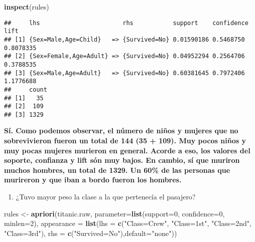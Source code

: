 \documentclass[]{article}
\newenvironment{Shaded}{\begin{snugshade}}{\end{snugshade}}
\newcommand{\DataTypeTok}[1]{\textcolor[rgb]{0.13,0.29,0.53}{#1}}
\newcommand{\DecValTok}[1]{\textcolor[rgb]{0.00,0.00,0.81}{#1}}
\newcommand{\KeywordTok}[1]{\textcolor[rgb]{0.13,0.29,0.53}{\textbf{#1}}}
\newcommand{\NormalTok}[1]{#1}
\newcommand{\StringTok}[1]{\textcolor[rgb]{0.31,0.60,0.02}{#1}}
\providecommand{\tightlist}{%
  \setlength{\itemsep}{0pt}\setlength{\parskip}{0pt}}
\begin{document}
\begin{Shaded}
\begin{Highlighting}[]
\KeywordTok{inspect}\NormalTok{(rules)}
\end{Highlighting}
\end{Shaded}

\begin{verbatim}
##     lhs                       rhs           support    confidence lift     
## [1] {Sex=Male,Age=Child}   => {Survived=No} 0.01590186 0.5468750  0.8078335
## [2] {Sex=Female,Age=Adult} => {Survived=No} 0.04952294 0.2564706  0.3788535
## [3] {Sex=Male,Age=Adult}   => {Survived=No} 0.60381645 0.7972406  1.1776688
##     count
## [1]   35 
## [2]  109 
## [3] 1329
\end{verbatim}

\textbf{Sí. Como podemos observar, el número de niños y mujeres que no
sobrevivieron fueron un total de 144 (35 + 109). Muy pocos niños y muy
pocas mujeres murieron en general. Acorde a eso, los valores del
soporte, confianza y lift són muy bajos. En cambio, sí que muriron
muchos hombres, un total de 1329. Un 60\% de las personas que murireron
y que iban a bordo fueron los hombres.}

\begin{enumerate}
\def\labelenumi{\alph{enumi})}
\setcounter{enumi}{1}
\tightlist
\item
  ¿Tuvo mayor peso la clase a la que pertenecía el pasajero?
\end{enumerate}

\begin{Shaded}
\begin{Highlighting}[]
\NormalTok{rules <-}\StringTok{ }\KeywordTok{apriori}\NormalTok{(titanic.raw, }\DataTypeTok{parameter=}\KeywordTok{list}\NormalTok{(}\DataTypeTok{support=}\DecValTok{0}\NormalTok{, }\DataTypeTok{confidence=}\DecValTok{0}\NormalTok{, }\DataTypeTok{minlen=}\DecValTok{2}\NormalTok{), }
                 \DataTypeTok{appearance =} \KeywordTok{list}\NormalTok{(}\DataTypeTok{lhs =} \KeywordTok{c}\NormalTok{(}\StringTok{"Class=Crew"}\NormalTok{, }\StringTok{"Class=1st"}\NormalTok{, }\StringTok{"Class=2nd"}\NormalTok{, }\StringTok{"Class=3rd"}\NormalTok{), }
                                   \DataTypeTok{rhs =} \KeywordTok{c}\NormalTok{(}\StringTok{"Survived=No"}\NormalTok{),}\DataTypeTok{default=}\StringTok{"none"}\NormalTok{))}
\end{Highlighting}
\end{Shaded}
\end{document}
